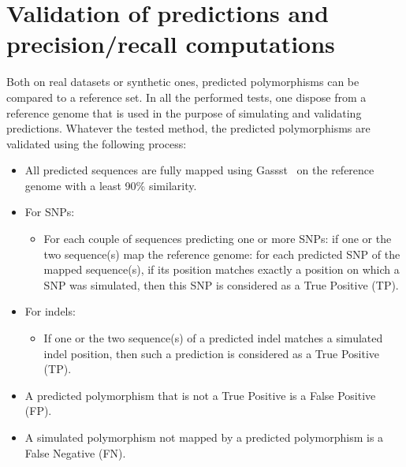 \documentclass{bmcart}
\begin{document}



\section*{Validation of predictions and precision/recall computations}
Both on real datasets or synthetic ones, predicted polymorphisms can be compared to a reference set. In all the performed tests, one dispose from a reference genome that is used in the purpose of simulating and validating predictions.
Whatever the tested method, the predicted polymorphisms are validated using the following process:
\begin{itemize}
	\item All predicted sequences are fully mapped using Gassst~\cite{Rizk2010} on the reference genome with a least 90\% similarity.
	\item For SNPs:
	\begin{itemize}
		\item For each couple of sequences predicting one or more SNPs: if one or the two sequence(s) map the reference genome: for each predicted SNP of the mapped sequence(s), if its position matches exactly a position on which a SNP was simulated, then this SNP is considered as a True Positive (TP).
	\end{itemize}
	\item For indels:
	\begin{itemize}
		\item If one or the two sequence(s) of a predicted indel matches a simulated indel position, then such a prediction is considered as a True Positive (TP).
	\end{itemize}
	\item A predicted polymorphism that is not a True Positive is a False Positive (FP).
	\item A simulated polymorphism not mapped by a predicted polymorphism is a False Negative (FN).
\end{itemize}
\end{document}
